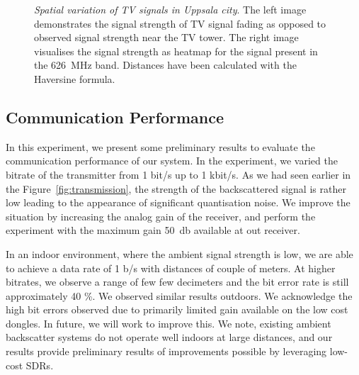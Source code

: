 \begin{figure}[h]
\begin{minipage}{0.49\columnwidth}
	\end{minipage}
	\vspace{-6mm}
	\caption{\emph{Spatial variation of TV signals in Uppsala city}. 
	The left image demonstrates the signal strength of TV signal fading	
	as opposed to observed signal strength near the TV tower. 
	The right image visualises the signal strength as heatmap for the signal
	present in the \SI{626}{\mega\hertz} band. Distances have been
calculated with the Haversine formula. }
 	\vspace{-6mm}

\label{fig:haversine}
\end{figure}

\balance

\subsection{Communication Performance}
In this experiment, we present some preliminary results to evaluate the communication
performance of our system.  In the experiment, we varied the bitrate of the transmitter
from 1 bit/s up to 1 kbit/s. As we had seen earlier in the Figure~\ref{fig:transmission}, the strength
of the backscattered signal is rather low leading to the appearance of significant quantisation noise.
We improve the situation by increasing the analog gain of the receiver, and perform
the experiment with the maximum gain \SI{50}{\decibel} available at out receiver.

In an indoor environment, where the ambient signal strength is low, we are
able to achieve a data rate of 1 b/s with distances of
couple of meters. At higher bitrates, we observe a range of few 
few decimeters and the  bit error rate is still approximately 40 \%. 
We observed similar results outdoors. We acknowledge the high bit errors
observed due to primarily limited gain available on the low cost dongles.
In future, we will work to improve this. We note, existing ambient backscatter
systems do not operate well indoors at large distances, and our results
provide preliminary results of  improvements possible by leveraging low-cost
SDRs.
